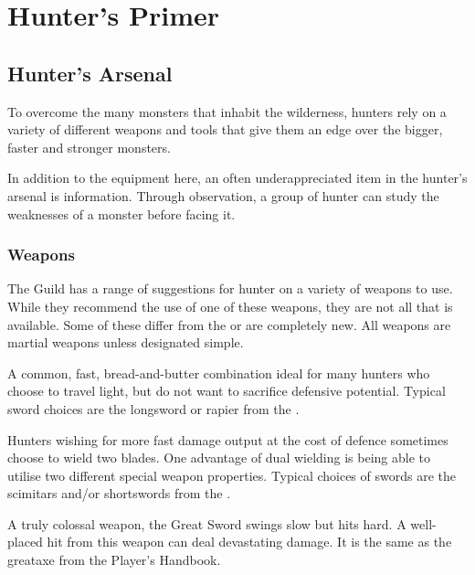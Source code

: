 \renewcommand*{\hbPartCover}{assets/ext/stand}
\renewcommand*{\hbPartSubcover}{assets/ext/stand2}
\part{Hunter's Primer}

\chapter{Hunter's Arsenal}
To overcome the many monsters that inhabit the wilderness, hunters rely on a variety of different weapons and tools that give them an edge over the bigger, faster and stronger monsters.

In addition to the equipment here, an often underappreciated item in the hunter's arsenal is information. Through observation, a group of hunter can study the weaknesses of a monster before facing it.

\section{Weapons}
The Guild has a range of suggestions for hunter on a variety of weapons to use. While they recommend the use of one of these weapons, they are not all that is available. Some of these differ from the \PHB{} or are completely new. All weapons are martial weapons unless designated simple.

A common, fast, bread-and-butter combination ideal for many hunters who choose to travel light, but do not want to sacrifice defensive potential. Typical sword choices are the longsword or rapier from the \PHB.

Hunters wishing for more fast damage output at the cost of defence sometimes choose to wield two blades. One advantage of dual wielding is being able to utilise two different special weapon properties. Typical choices of swords are the scimitars and/or shortswords from the \PHB.

A truly colossal weapon, the Great Sword swings slow but hits hard. A well-placed hit from this weapon can deal devastating damage. It is the same as the greataxe from the Player's Handbook.


